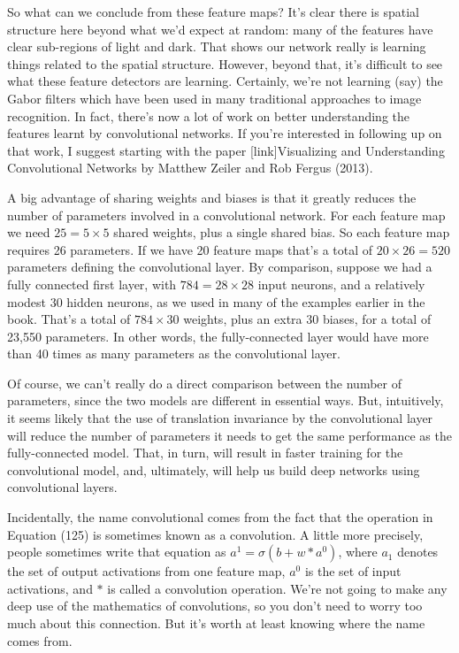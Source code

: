 \documentclass[a4paper,twoside,10pt]{book}
\begin{document}
So what can we conclude from these feature maps? It's clear there is spatial structure here beyond what we'd expect at random: many of the features have clear sub-regions of light and dark. That shows our network really is learning things related to the spatial structure. However, beyond that, it's difficult to see what these feature detectors are learning. Certainly, we're not learning (say) the Gabor filters which have been used in many traditional approaches to image recognition. In fact, there's now a lot of work on better understanding the features learnt by convolutional networks. If you're interested in following up on that work, I suggest starting with the paper [link]Visualizing and Understanding Convolutional Networks by Matthew Zeiler and Rob Fergus (2013).

A big advantage of sharing weights and biases is that it greatly reduces the number of parameters involved in a convolutional network. For each feature map we need $25=5\times5$ shared weights, plus a single shared bias. So each feature map requires 26 parameters. If we have 20 feature maps that's a total of $20\times26=520$ parameters defining the convolutional layer. By comparison, suppose we had a fully connected first layer, with $784=28\times28$ input neurons, and a relatively modest 30 hidden neurons, as we used in many of the examples earlier in the book. That's a total of $784\times30$ weights, plus an extra 30 biases, for a total of 23,550 parameters. In other words, the fully-connected layer would have more than 40 times as many parameters as the convolutional layer.

Of course, we can't really do a direct comparison between the number of parameters, since the two models are different in essential ways. But, intuitively, it seems likely that the use of translation invariance by the convolutional layer will reduce the number of parameters it needs to get the same performance as the fully-connected model. That, in turn, will result in faster training for the convolutional model, and, ultimately, will help us build deep networks using convolutional layers.

Incidentally, the name convolutional comes from the fact that the operation in Equation (125) is sometimes known as a convolution. A little more precisely, people sometimes write that equation as $a^1=\sigma(b+w\ast a^0)$, where $a_1$ denotes the set of output activations from one feature map, $a^0$ is the set of input activations, and $\ast$ is called a convolution operation. We're not going to make any deep use of the mathematics of convolutions, so you don't need to worry too much about this connection. But it's worth at least knowing where the name comes from.
\end{document}
